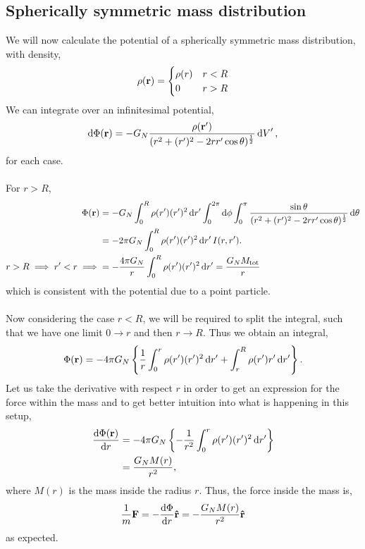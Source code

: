 \documentclass{book}
\begin{document}
\subsection{Spherically symmetric mass distribution}
We will now calculate the potential of a spherically symmetric mass distribution, with density,
\begin{equation}
    \rho(\vb{r}) =
    \begin{cases}
        \rho(r) & r < R \\
        0 & r > R
    \end{cases}
\end{equation}
We can integrate over an infinitesimal potential, 
\begin{equation}
    \dd{\Phi(\vb{r})} = -G_N \frac{\rho(\vb{r}')}{(r^2 + (r')^2 - 2rr'\cos\theta)^{\frac{1}{2}}}\dd{V}',
\end{equation}
for each case. \\\\
For $r > R$,
\begin{equation}
    \begin{split}
        \Phi(\vb{r}) & = -G_N \int_0^R\rho(r')(r')^2\dd{r'}\int_0^{2\pi}\dd{\phi}\int_0^{\pi}\frac{\sin\theta}{(r^2+(r')^2 - 2rr'\cos\theta)^{\frac{1}{2}}}\dd{\theta} \\
        & = -2\pi G_N\int_0^R\rho(r')(r')^2\dd{r'}I(r,r').\\
        r > R \implies r' < r \implies & = -\frac{4\pi G_N}{r}\int_0^R\rho(r')(r')^2\dd{r'} = \frac{G_NM_{\text{tot}}}{r}
    \end{split}
\end{equation}
which is consistent with the potential due to a point particle.\\\\
Now considering the case $r < R$, we will be required to split the integral, such that we have one limit $0 \to r$ and then $r \to R$. Thus we obtain an integral,
\begin{equation}
    \Phi(\vb{r}) = -4\pi G_N \left\{ \frac{1}{r} \int_0^r \rho(r')(r')^2\dd{r'} + \int_r^R\rho(r')r'\dd{r'} \right\}.
\end{equation}
Let us take the derivative with respect $r$ in order to get an expression for the force within the mass and to get better intuition into what is happening in this setup,
\begin{equation}
\begin{split}
    \dv{\Phi(\vb{r})}{r} & = -4\pi G_N \left\{-\frac{1}{r^2}\int_0^r\rho(r')(r')^2\dd{r'}\right\} \\
    & = \frac{G_NM(r)}{r^2},
\end{split}
\end{equation}
where $M(r)$ is the mass inside the radius $r$. Thus, the force inside the mass is,
\begin{equation}
    \frac{1}{m}\vb{F} = -\dv{\Phi}{r}\vu{r} = - \frac{G_NM(r)}{r^2}\vu{r}
\end{equation}
as expected.
\end{document}
